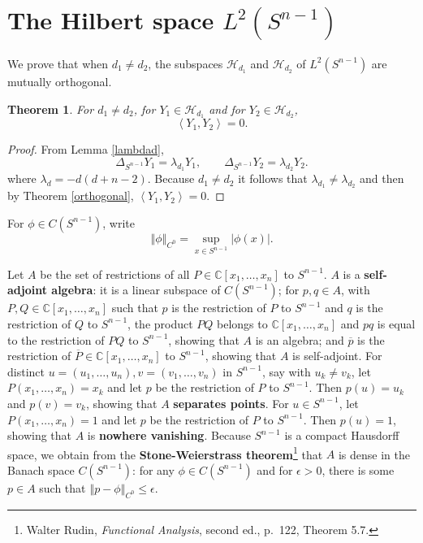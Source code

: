 \documentclass{article}
\newcommand{\inner}[2]{\left\langle #1, #2 \right\rangle}
\newcommand{\norm}[1]{\left\Vert #1 \right\Vert}
\newtheorem{theorem}{Theorem}
\theoremstyle{definition}
\begin{document}
\section{The Hilbert space $L^2(S^{n-1})$} 
We prove that when $d_1 \neq d_2$, the subspaces
$\mathscr{H}_{d_1}$ and $\mathscr{H}_{d_2}$ of $L^2(S^{n-1})$
are mutually orthogonal.

\begin{theorem}
For $d_1 \neq d_2$, for $Y_1 \in \mathscr{H}_{d_1}$ and for $Y_2 \in \mathscr{H}_{d_2}$, 
\[
\inner{Y_1}{Y_2}=0.
\]
\label{Hdorthogonal}
\end{theorem}
\begin{proof}
From Lemma \ref{lambdad},
\[
\Delta_{S^{n-1}} Y_1 =\lambda_{d_1}Y_1,
\qquad
\Delta_{S^{n-1}} Y_2 =\lambda_{d_2}Y_2.
\]
where $\lambda_d =  -d(d+n-2)$. Because $d_1 \neq d_2$ it follows that
$\lambda_{d_1} \neq \lambda_{d_2}$ and then by Theorem \ref{orthogonal},
$\inner{Y_1}{Y_2}=0$.
\end{proof}


For $\phi \in C(S^{n-1})$, write
\[
\norm{\phi}_{C^0} = \sup_{x \in S^{n-1}} |\phi(x)|.
\]

Let $A$ be the set of restrictions of all $P \in \mathbb{C}[x_1,\ldots,x_n]$ to
$S^{n-1}$. $A$ is a \textbf{self-adjoint algebra}: it is a linear subspace of 
$C(S^{n-1})$; for $p,q \in A$, with $P,Q \in \mathbb{C}[x_1,\ldots,x_n]$ such that
$p$ is the restriction of $P$ to $S^{n-1}$ and $q$ is the restriction of $Q$ to $S^{n-1}$,
the product $PQ$ belongs to $\mathbb{C}[x_1,\ldots,x_n]$ and $pq$ is equal
to the restriction of $PQ$ to $S^{n-1}$, showing that $A$ is an algebra; and $\overline{p}$
is the restriction of $\overline{P} \in \mathbb{C}[x_1,\ldots,x_n]$ to $S^{n-1}$, showing
that $A$ is self-adjoint. 
For distinct $u=(u_1,\ldots,u_n), v = (v_1,\ldots,v_n)$ in $S^{n-1}$, say with $u_k \neq v_k$,
let $P(x_1,\ldots,x_n)=x_k$ and let $p$ be the restriction of $P$ to $S^{n-1}$. 
Then $p(u) = u_k$ and $p(v)=v_k$, showing that $A$ \textbf{separates points}.
For $u \in S^{n-1}$, let $P(x_1,\ldots,x_n) = 1$ and let
$p$ be the restriction of $P$ to $S^{n-1}$. Then $p(u) = 1$, showing that
$A$ is \textbf{nowhere vanishing}. Because
$S^{n-1}$ is a compact Hausdorff space,
we obtain from the
\textbf{Stone-Weierstrass theorem}\footnote{Walter Rudin, {\em Functional
Analysis}, second ed., p.~122, Theorem 5.7.} that $A$ is dense in the Banach
space $C(S^{n-1})$: for any $\phi \in C(S^{n-1})$ and for $\epsilon>0$, there is some
$p \in A$ such that $\norm{p-\phi}_{C^0} \leq \epsilon$. 
\end{document}
